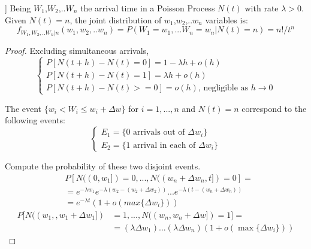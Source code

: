 \begin{theorem}[5.7, Joint probability of [$W_{1}$,..$W_{n}$]]
	Being $W_{1}$,$W_{2}$,..$W_{n}$ the arrival time in a Poisson Process $N(t)$ with rate ${\lambda}>0$. Given $N(t)=n$, the joint distribution of $w_{1}$,$w_{2}$,..$w_{n}$ variables is:
	\begin{equation}
	f_{W_1,W_2,..W_n|n} (w_1,w_2,..w_n) = P (W_1=w_1,...W_n=w_n|N(t)=n) = n!/t^n
	\end{equation}
	\begin{proof}
		Excluding simultaneous arrivals,
		\begin{equation*}
			\begin{cases}
				P[N(t+h)-N(t)=0]= 1 - \lambda h+ o(h) \\
				P[N(t+h)-N(t)=1]= \lambda h+ o(h) \\
				P[N(t+h)-N(t)>=0]= o(h) \text{, negligible as } h\rightarrow 0
			\end{cases}
		\end{equation*}

		The event $ \{w_i<W_i \leq w_i+\Delta w \}$ for $i=1,...,n$ and $N(t)=n$ correspond to the following events:
		\begin{equation*}
			\begin{cases}
				E_1=\{\text{0 arrivals out of } \Delta w_i \} \\
				E_2=\{\text{1 arrival in each of } \Delta w_i \}
			\end{cases}
		\end{equation*}

		Compute the probability of these two disjoint events.
		\begin{equation}
			\begin{split}
				& P[N((0,w_1])=0,...,N((w_n+\Delta w_n,t])=0] = \\
				& = e^{-\lambda w_1} e^{-\lambda (w_2-(w_2+\Delta w_2))} ... e^{-\lambda (t-(w_n+\Delta w_n))} \\
				& =e^{-\lambda t} (1+o(max\{\Delta w_i\}))
			\end{split}
		\end{equation}
		\begin{equation}
			\begin{split}
				P[N((w_1,,w_1+\Delta w_1]) &=1,...,N((w_n,w_n+\Delta w])=1] =\\
				& = (\lambda \Delta w_1) ... (\lambda \Delta w_n) (1+o(\max\{\Delta w_i\}))
			\end{split}
		\end{equation}


\end{proof}
\end{theorem}
